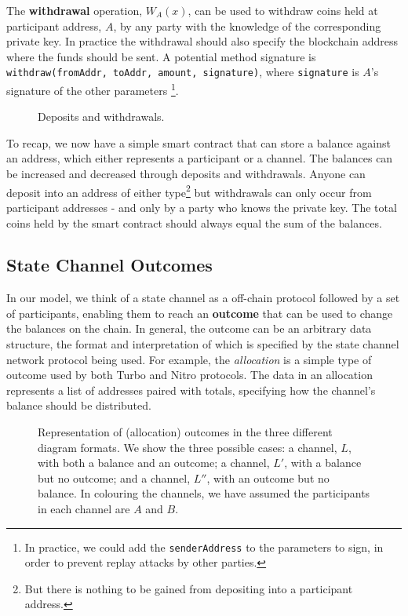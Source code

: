 \documentclass{article}
\begin{document}
The \textbf{withdrawal} operation, $W_A(x)$, can be used to withdraw coins held at participant address, $A$, by any
party with the knowledge of the corresponding private key. 
In practice the withdrawal should also specify the blockchain address where the funds should be sent.
A potential method signature is \texttt{withdraw(fromAddr, toAddr, amount, signature)}, 
where \texttt{signature} is $A$'s signature of the other parameters
\footnote{In practice, we could add the \texttt{senderAddress} to the parameters to sign,
in order to prevent replay attacks by other parties.}.

\begin{figure}[h]\centering
  \makebox[\textwidth][c]{}
  \caption{Deposits and withdrawals.}\label{fig:deposit-withdrawal}
\end{figure}

To recap, we now have a simple smart contract that can store a balance against an address, which either represents a participant or a channel.
The balances can be increased and decreased through deposits and withdrawals.
Anyone can deposit into an address of either type\footnote{But there is nothing to be gained from depositing into a participant address.} but withdrawals can only occur from 
participant addresses - and only by a party who knows the private key.
The total coins held by the smart contract should always equal the sum of the balances.

\subsection{State Channel Outcomes}

In our model, we think of a state channel as a off-chain protocol followed by a set of participants,
enabling them to reach an \textbf{outcome} that can be used to change the balances on the chain.
In general, the outcome can be an arbitrary data structure, the format and interpretation of which
is specified by the state channel network protocol being used.
For example, the \textit{allocation} is a simple type of outcome used by both Turbo and Nitro
protocols.
The data in an allocation represents a list of addresses paired with totals,
specifying how the channel's balance should be distributed.

\begin{figure}[h]\centering
  \makebox[\textwidth][c]{}
  \caption{
    Representation of (allocation) outcomes in the three different diagram formats.
    We show the three possible cases: a channel, $L$, with both a balance and an outcome;
    a channel, $L'$, with a balance but no outcome; 
    and a channel, $L''$, with an outcome but no balance.
    In colouring the channels, we have assumed the participants in each channel are $A$ and $B$.
  }\label{fig:outcome-notation}
\end{figure} 
\end{document}
